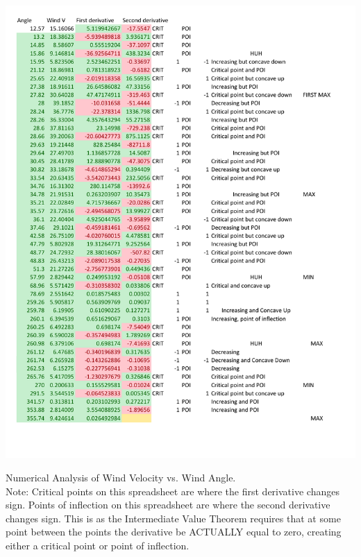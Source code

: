 \documentclass{article}
\begin{document}
\begin{table}[H]
\centering
\includegraphics[width=\textwidth]{alan-data-3.pdf}
\caption{Numerical Analysis of Wind Velocity vs. Wind Angle. \\Note: Critical points on this spreadsheet are where the first derivative changes sign. Points of inflection on this spreadsheet are where the second derivative changes sign. This is as the Intermediate Value Theorem requires that at some point between the points the derivative be ACTUALLY equal to zero, creating either a critical point or point of inflection.}
\end{table}
\end{document}
